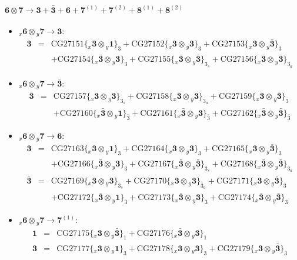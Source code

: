 \documentclass[english]{article}
\newcommand{\rep}[1]{\mathbf{#1}}
\newcommand{\repx}[2]{{}_{#2}\mathbf{#1}}
\newcommand{\subcg}[3]{\big\{ \repx{#1}{x}\otimes\repx{#2}{y}\big\}^{}_{#3}}
\begin{document}
\paragraph*{\Large $\rep{6}\otimes\rep{7}\to\rep{3}+\rep{\bar{3}}+\rep{6}+\rep{7}^{(1)}+\rep{7}^{(2)}+\rep{8}^{(1)}+\rep{8}^{(2)}$}
\begin{itemize}
\item $\repx{6}{x}\otimes\repx{7}{y}\to\rep{3}$:
\begin{eqnarray*}
\rep{3} &=& \text{CG27151}\subcg{3}{1}{3}+\text{CG27152}\subcg{3}{3}{3}+\text{CG27153}\subcg{3}{\bar{3}}{3} \\ 
 & & +\text{CG27154}\subcg{\bar{3}}{3}{3}+\text{CG27155}\subcg{\bar{3}}{\bar{3}}{3_{s}}+\text{CG27156}\subcg{\bar{3}}{\bar{3}}{3_{a}}
\end{eqnarray*}
\item $\repx{6}{x}\otimes\repx{7}{y}\to\rep{\bar{3}}$:
\begin{eqnarray*}
\rep{\bar{3}} &=& \text{CG27157}\subcg{3}{3}{\bar{3}_{s}}+\text{CG27158}\subcg{3}{3}{\bar{3}_{a}}+\text{CG27159}\subcg{3}{\bar{3}}{\bar{3}} \\ 
 & & +\text{CG27160}\subcg{\bar{3}}{1}{\bar{3}}+\text{CG27161}\subcg{\bar{3}}{3}{\bar{3}}+\text{CG27162}\subcg{\bar{3}}{\bar{3}}{\bar{3}}
\end{eqnarray*}
\item $\repx{6}{x}\otimes\repx{7}{y}\to\rep{6}$:
\begin{eqnarray*}
\rep{3} &=& \text{CG27163}\subcg{3}{1}{3}+\text{CG27164}\subcg{3}{3}{3}+\text{CG27165}\subcg{3}{\bar{3}}{3} \\ 
 & & +\text{CG27166}\subcg{\bar{3}}{3}{3}+\text{CG27167}\subcg{\bar{3}}{\bar{3}}{3_{s}}+\text{CG27168}\subcg{\bar{3}}{\bar{3}}{3_{a}}
\\
\rep{\bar{3}} &=& \text{CG27169}\subcg{3}{3}{\bar{3}_{s}}+\text{CG27170}\subcg{3}{3}{\bar{3}_{a}}+\text{CG27171}\subcg{3}{\bar{3}}{\bar{3}} \\ 
 & & +\text{CG27172}\subcg{\bar{3}}{1}{\bar{3}}+\text{CG27173}\subcg{\bar{3}}{3}{\bar{3}}+\text{CG27174}\subcg{\bar{3}}{\bar{3}}{\bar{3}}
\end{eqnarray*}
\item $\repx{6}{x}\otimes\repx{7}{y}\to\rep{7}^{(1)}$:
\begin{eqnarray*}
\rep{1} &=& \text{CG27175}\subcg{3}{\bar{3}}{1}+\text{CG27176}\subcg{\bar{3}}{3}{1}
\\
\rep{3} &=& \text{CG27177}\subcg{3}{1}{3}+\text{CG27178}\subcg{3}{3}{3}+\text{CG27179}\subcg{3}{\bar{3}}{3} \\ 

\end{eqnarray*}
\end{itemize}
\end{document}
